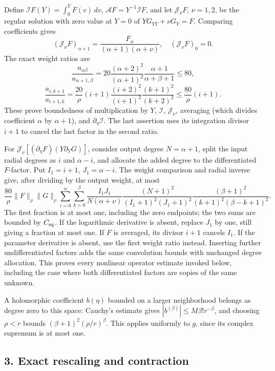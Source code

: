 \documentclass[10pt,a4paper]{article}
\begin{document}
Define \(\mathcal I F(Y)=\int_0^YF(v)\,dv\), \(\mathcal A F=Y^{-1}\mathcal I F\), and let \(\mathcal J_\nu F\), \(\nu=1,2\), be the regular solution with zero value at \(Y=0\) of \(YG_{YY}+\nu G_Y=F\). Comparing coefficients gives
\[
(\mathcal J_\nu F)_{\alpha+1}=\frac{F_\alpha}{(\alpha+1)(\alpha+\nu)},
\quad (\mathcal J_\nu F)_0=0.
\]
The exact weight ratios are
\[
\frac{a_{\alpha\beta}}{a_{\alpha+1,\beta}}
=20\frac{(\alpha+2)^2}{(\alpha+1)^2}
\frac{\alpha+1}{\alpha+\beta+1}\le80,
\]
\[
\frac{a_{i,k+1}}{a_{i+1,k}}
=\frac{20}{\rho}(i+1)\frac{(i+2)^2}{(i+1)^2}
\frac{(k+1)^2}{(k+2)^2}\le\frac{80}{\rho}(i+1).
\]
These prove boundedness of multiplication by \(Y\), \(\mathcal I\), \(\mathcal J_\nu\), averaging (which divides coefficient \(\alpha\) by \(\alpha+1\)), and \(\partial_\eta\mathcal I\). The last assertion uses its integration divisor \(i+1\) to cancel the last factor in the second ratio.

For \(\mathcal J_\nu[(\partial_\eta F)(Y\partial_YG)]\), consider output degree \(N=\alpha+1\), split the input radial degrees as \(i\) and \(\alpha-i\), and allocate the added degree to the differentiated \(F\)-factor. Put \(I_1=i+1\), \(J_1=\alpha-i\). The weight comparison and radial inverse give, after dividing by the output weight, at most
\[
\frac{80}{\rho}\|F\|_\rho\|G\|_\rho
\sum_{i=0}^\alpha\sum_{k=0}^\beta
\frac{I_1J_1}{N(\alpha+\nu)}
\frac{(N+1)^2}{(I_1+1)^2(J_1+1)^2}
\frac{(\beta+1)^2}{(k+1)^2(\beta-k+1)^2}.
\]
The first fraction is at most one, including the zero endpoints; the two sums are bounded by \(C_{\rm sq}\). If the logarithmic derivative is absent, replace \(J_1\) by one, still giving a fraction at most one. If \(F\) is averaged, its divisor \(i+1\) cancels \(I_1\). If the parameter derivative is absent, use the first weight ratio instead. Inserting further undifferentiated factors adds the same convolution bounds with unchanged degree allocation. This proves every nonlinear operator estimate invoked below, including the case where both differentiated factors are copies of the same unknown.

A holomorphic coefficient \(b(\eta)\) bounded on a larger neighborhood belongs as degree zero to this space: Cauchy's estimate gives \(|b^{(\beta)}|\le M\beta!r^{-\beta}\), and choosing \(\rho<r\) bounds \((\beta+1)^2(\rho/r)^\beta\). This applies uniformly to \(g\), since its complex supremum is at most one.

\subsection{3. Exact rescaling and contraction}
\end{document}
